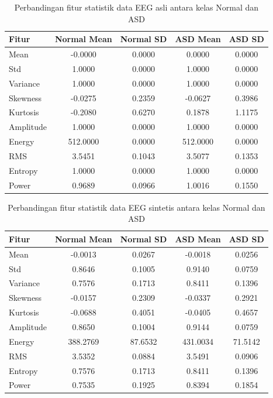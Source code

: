 \begin{table}[H]
\centering
\footnotesize
\caption{Perbandingan fitur statistik data EEG asli antara kelas Normal dan ASD}
\label{tab:real_normal_vs_asd}
\begin{tabular}{|l|c|c|c|c|}
\hline
\textbf{Fitur} & \textbf{Normal Mean} & \textbf{Normal SD} & \textbf{ASD Mean} & \textbf{ASD SD} \\
\hline
Mean      & -0.0000 & 0.0000 & 0.0000 & 0.0000 \\
Std       & 1.0000 & 0.0000 & 1.0000 & 0.0000 \\
Variance  & 1.0000 & 0.0000 & 1.0000 & 0.0000 \\
Skewness  & -0.0275 & 0.2359 & -0.0627 & 0.3986 \\
Kurtosis  & -0.2080 & 0.6270 & 0.1878 & 1.1175 \\
Amplitude & 1.0000 & 0.0000 & 1.0000 & 0.0000 \\
Energy    & 512.0000 & 0.0000 & 512.0000 & 0.0000 \\
RMS       & 3.5451 & 0.1043 & 3.5077 & 0.1353 \\
Entropy   & 1.0000 & 0.0000 & 1.0000 & 0.0000 \\
Power     & 0.9689 & 0.0966 & 1.0016 & 0.1550 \\
\hline
\end{tabular}
\end{table}
\begin{table}[H]
\centering
\footnotesize
\caption{Perbandingan fitur statistik data EEG sintetis antara kelas Normal dan ASD}
\label{tab:synthetic_normal_vs_asd}
\begin{tabular}{|l|c|c|c|c|}
\hline
\textbf{Fitur} & \textbf{Normal Mean} & \textbf{Normal SD} & \textbf{ASD Mean} & \textbf{ASD SD} \\
\hline
Mean      & -0.0013 & 0.0267 & -0.0018 & 0.0256 \\
Std       & 0.8646 & 0.1005 & 0.9140 & 0.0759 \\
Variance  & 0.7576 & 0.1713 & 0.8411 & 0.1396 \\
Skewness  & -0.0157 & 0.2309 & -0.0337 & 0.2921 \\
Kurtosis  & -0.0688 & 0.4051 & -0.0405 & 0.4657 \\
Amplitude & 0.8650 & 0.1004 & 0.9144 & 0.0759 \\
Energy    & 388.2769 & 87.6532 & 431.0034 & 71.5142 \\
RMS       & 3.5352 & 0.0884 & 3.5491 & 0.0906 \\
Entropy   & 0.7576 & 0.1713 & 0.8411 & 0.1396 \\
Power     & 0.7535 & 0.1925 & 0.8394 & 0.1854 \\
\hline
\end{tabular}
\end{table}
